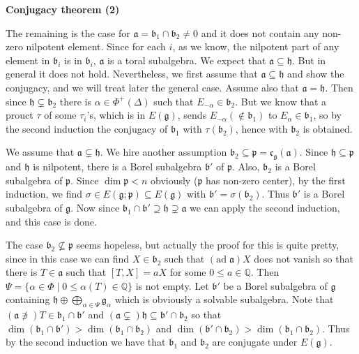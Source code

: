 \documentclass{article}
\newcommand{\RaQ}{\mathbb{Q}}
\newcommand{\SBar}{\;|\;}
\newcommand{\lie}[1]{\mathfrak{#1}}
\newcommand{\ad}[1]{\mathrm{ad}\; #1}
\begin{document}
\newpage

\textbf{Conjugacy theorem (2)}

The remaining is the case for $\lie{a} = \lie{b}_1 \cap \lie{b}_2 \ne 0$ and it does not contain any non-zero nilpotent element.
Since for each $i$, as we know, the nilpotent part of any element in $\lie{b}_i$ is in $\lie{b}_i$, $\lie{a}$ is a toral subalgebra.
We expect that $\lie{a} \subseteq \lie{h}$.
But in general it does not hold.
Nevertheless, we first assume that $\lie{a} \subseteq \lie{h}$ and show the conjugacy, and we will treat later the general case.
Assume also that $\lie{a} = \lie{h}$.
Then since $\lie{h} \subsetneq \lie{b}_2$ there is $\alpha \in \Phi^+(\Delta)$ such that $E_{-\alpha} \in \lie{b}_2$.
But we know that a prouct $\tau$ of some $\tau_i$'s, which is in $E(\lie{g})$, sends $E_{-\alpha} (\notin \lie{b}_1)$ to $E_\alpha \in \lie{b}_1$, so by the second induction the conjugacy of $\lie{b}_1$ with $\tau(\lie{b}_2)$, hence with $\lie{b}_2$ is obtained.

We assume that $\lie{a} \subsetneq \lie{h}$.
We hire another assumption $\lie{b}_2 \subseteq \lie{p} = \lie{c}_\lie{g}(\lie{a})$.
Since $\lie{h} \subseteq \lie{p}$ and $\lie{h}$ is nilpotent, there is a Borel subalgebra $\lie{b}'$ of $\lie{p}$.
Also, $\lie{b}_2$ is a Borel subalgebra of $\lie{p}$.
Since $\dim{\lie{p}} < n$ obviously ($\lie{p}$ has non-zero center), by the first induction, we find $\sigma \in E(\lie{g}; \lie{p}) \subseteq E(\lie{g})$ with $\lie{b}' = \sigma(\lie{b}_2)$.
Thus $\lie{b}'$ is a Borel subalgebra of $\lie{g}$.
Now since $\lie{b}_1 \cap \lie{b}' \supseteq \lie{h} \supsetneq \lie{a}$ we can apply the second induction, and this case is done.

The case $\lie{b}_2 \not\subseteq \lie{p}$ seems hopeless, but actually the proof for this is quite pretty, since in this case we can find $X \in \lie{b}_2$ such that $(\ad{\lie{a}})X$ does not vanish so that there is $T \in \lie{a}$ such that $[T, X] = aX$ for some $0 \le a \in \RaQ$.
Then $\Psi = \{\alpha \in \Phi \SBar 0 \le \alpha(T) \in \RaQ\}$ is not empty.
Let $\lie{b}'$ be a Borel subalgebra of $\lie{g}$ containing $\lie{h} \oplus \bigoplus_{\alpha \in \Psi} \lie{g}_\alpha$ which is obviously a solvable subalgebra.
Note that $(\lie{a} \not\ni) T \in \lie{b}_1 \cap \lie{b}'$ and $(\lie{a} \subsetneq) \lie{h} \subseteq \lie{b}' \cap \lie{b}_2$ so that $\dim{(\lie{b}_1 \cap \lie{b}')} > \dim{(\lie{b}_1 \cap \lie{b}_2)}$ and $\dim{(\lie{b'} \cap \lie{b}_2)} > \dim{(\lie{b}_1 \cap \lie{b}_2)}$.
Thus by the second induction we have that $\lie{b}_1$ and $\lie{b}_2$ are conjugate under $E(\lie{g})$.
\end{document}
